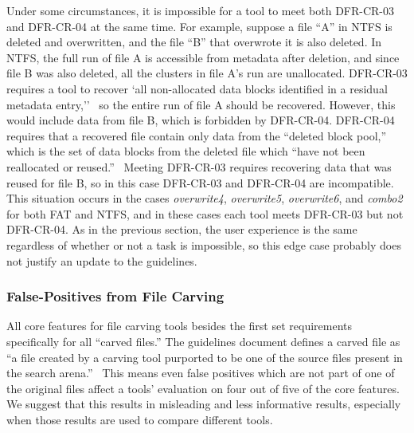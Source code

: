 Under some circumstances, it is impossible for a tool to meet both DFR-CR-03 and DFR-CR-04 at the same time.
For example, suppose a file ``A'' in NTFS is deleted and overwritten, and the file ``B'' that overwrote it is also deleted.
In NTFS, the full run of file A is accessible from metadata after deletion, and since file B was also deleted, all the clusters in file A's run are unallocated.
DFR-CR-03 requires a tool to recover `all non-allocated data blocks identified in a residual metadata entry,''~\cite{meta:dfr:standards} so the entire run of file A should be recovered.
However, this would include data from file B, which is forbidden by DFR-CR-04.
DFR-CR-04 requires that a recovered file contain only data from the ``deleted block pool,'' which is the set of data blocks from the deleted file which ``have not been reallocated or reused.''~\cite{meta:dfr:standards}
Meeting DFR-CR-03 requires recovering data that was reused for file B, so in this case DFR-CR-03 and DFR-CR-04 are incompatible.
This situation occurs in the cases \emph{overwrite4}, \emph{overwrite5}, \emph{overwrite6}, and \emph{combo2} for both FAT and NTFS, and in these cases each tool meets DFR-CR-03 but not DFR-CR-04.
As in the previous section, the user experience is the same regardless of whether or not a task is impossible, so this edge case probably does not justify an update to the guidelines.



\subsubsection{False-Positives from File Carving} \label{sec:false_pos}

All core features for file carving tools besides the first set requirements specifically for all ``carved files.''
The guidelines document defines a carved file as ``a file created by a carving tool purported to be one of the source files present in the search arena.''~\cite{carving_standards}
This means even false positives which are not part of one of the original files affect a tools' evaluation on four out of five of the core features.
We suggest that this results in misleading and less informative results, especially when those results are used to compare different tools.
 
